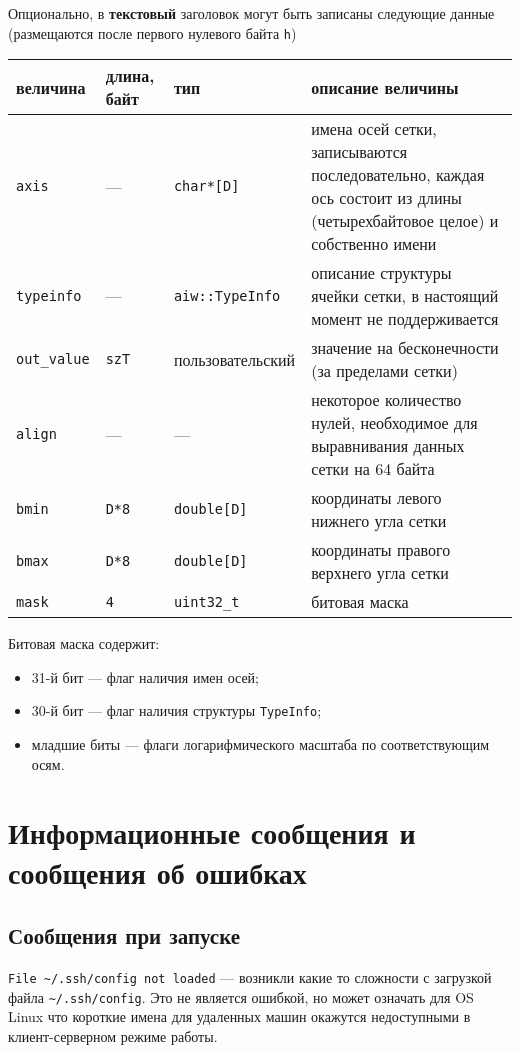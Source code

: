 \documentclass[12pt]{article}
\begin{document}
Опционально, в {\bf текстовый} заголовок могут быть записаны следующие данные (размещаются после первого нулевого байта {\tt h})
\begin{center}
\begin{tabular}{|p{}|p{}|p{}|p{}|}
\hline
величина & длина, байт & тип & описание величины \\
\hline
  {\tt axis} & --- & {\tt char*[D]} & имена осей сетки, записываются последовательно, каждая ось состоит из длины (четырехбайтовое целое) и собственно имени\\
  {\tt typeinfo} & --- & {\tt aiw::TypeInfo} & описание структуры ячейки сетки, в настоящий момент не поддерживается \\
  {\tt out\_value} & {\tt szT} & пользовательский & значение на бесконечности (за пределами сетки) \\
  {\tt align} & --- & --- & некоторое количество нулей, необходимое для выравнивания данных сетки на 64 байта \\
  {\tt bmin} & {\tt D*8} & {\tt double[D]} & координаты левого нижнего угла сетки \\
  {\tt bmax} & {\tt D*8} & {\tt double[D]} & координаты правого верхнего угла сетки \\
  {\tt mask} & {\tt 4} & {\tt uint32\_t} & битовая маска \\  
  \hline
\end{tabular}
\end{center}
Битовая маска содержит:
\begin{itemize}
  \item 31-й бит --- флаг наличия имен осей;
  \item 30-й бит --- флаг наличия структуры {\tt TypeInfo};
  \item младшие биты --- флаги логарифмического масштаба по соответствующим осям.
\end{itemize}
\section{Информационные сообщения и сообщения об ошибках}  
\subsection{Сообщения при запуске}
\verb'File ~/.ssh/config not loaded' --- возникли какие то сложности с загрузкой файла \verb'~/.ssh/config'.
Это не является ошибкой, но может означать для OS Linux что короткие имена для удаленных машин окажутся недоступными в клиент-серверном режиме работы.
\end{document}
